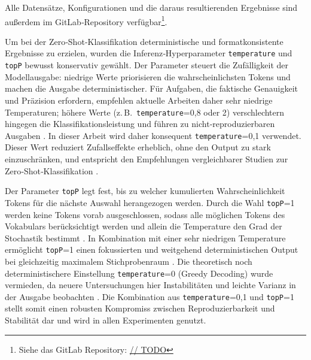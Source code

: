Alle Datensätze, Konfigurationen und die daraus resultierenden
Ergebnisse sind außerdem im GitLab‑Repository verfügbar\footnote{Siehe das GitLab Repository: \hyperlink{https://gitlab.com/andreaskonrad/bpmn-gdpr-llm-evaluation}{// TODO}}.

Um bei der Zero‑Shot‑Klassifikation deterministische und formatkonsistente Ergebnisse zu erzielen, wurden die Inferenz‑Hyperparameter \texttt{temperature} und \texttt{topP} bewusst konservativ gewählt. Der Parameter  steuert die Zufälligkeit der Modellausgabe: niedrige Werte priorisieren die wahrscheinlichsten Tokens und machen die Ausgabe deterministischer. Für Aufgaben, die faktische Genauigkeit und Präzision erfordern, empfehlen aktuelle Arbeiten daher sehr niedrige Temperaturen; höhere Werte (z.\,B.\ \texttt{temperature}=0{,}8 oder 2) verschlechtern hingegen die Klassifikationsleistung und führen zu nicht‑reproduzierbaren Ausgaben \cite{renze2024effect,mu2024navigating}.
In dieser Arbeit wird daher konsequent \texttt{temperature}=0{,}1 verwendet. Dieser Wert reduziert Zufallseffekte erheblich, ohne den Output zu stark einzuschränken, und entspricht den Empfehlungen vergleichbarer Studien zur Zero‑Shot‑Klassifikation \cite{mu2024navigating}.

Der Parameter \texttt{topP} legt fest, bis zu welcher kumulierten Wahrscheinlichkeit Tokens für die nächste Auswahl herangezogen werden. Durch die Wahl \texttt{topP}=1 werden keine Tokens vorab ausgeschlossen, sodass alle möglichen Tokens des Vokabulars berücksichtigt werden und allein die Temperature den Grad der Stochastik bestimmt \cite{renze2024effect}. In Kombination mit einer sehr niedrigen Temperature ermöglicht \texttt{topP}=1 einen fokussierten und weitgehend deterministischen Output bei gleichzeitig maximalem Stichprobenraum \cite{mu2024navigating}.
Die theoretisch noch deterministischere Einstellung \texttt{temperature}=0 (Greedy Decoding) wurde vermieden, da neuere Untersuchungen hier Instabilitäten und leichte Varianz in der Ausgabe beobachten \cite{atil2024nondeterminism}.
Die Kombination aus \texttt{temperature}=0{,}1 und \texttt{topP}=1 stellt somit einen robusten Kompromiss zwischen Reproduzierbarkeit und Stabilität dar und wird in allen Experimenten genutzt.